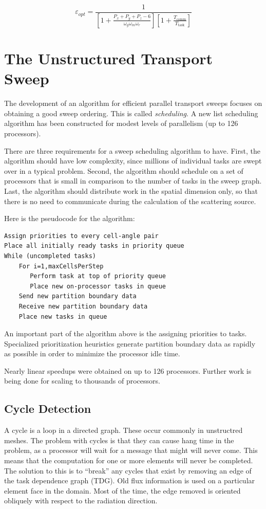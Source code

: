 \documentclass[11pt, letterpaper,titlepage,oneside]{article}
\begin{document}
\begin{equation}
\varepsilon_{opt} = \frac{1}{[1+\frac{P_x+P_y+P_z-6}{\omega_g \omega_m \omega_r}][1+\frac{T_{\text{comm}}}{T_{\text{task}}}]}
\label{overloadpartitioning}
\end{equation}
\section*{The Unstructured Transport Sweep}

The development of an algorithm for efficient parallel transport sweeps focuses on obtaining a good sweep ordering. This is called \textit{scheduling}. A new list scheduling algorithm has been constructed for modest levels of parallelism (up to 126 processors).

There are three requirements for a sweep scheduling algorithm to have. First, the algorithm should have low complexity, since millions of individual tasks are swept over in a typical problem. Second, the algorithm should schedule on a set of processors that is small in comparison to the number of tasks in the sweep graph. Last, the algorithm should distribute work in the spatial dimension only, so that there is no need to communicate during the calculation of the scattering source. 

Here is the pseudocode for the algorithm:

\begin{verbatim}
Assign priorities to every cell-angle pair
Place all initially ready tasks in priority queue
While (uncompleted tasks)
    For i=1,maxCellsPerStep
       Perform task at top of priority queue
       Place new on-processor tasks in queue
    Send new partition boundary data
    Receive new partition boundary data
    Place new tasks in queue 
\end{verbatim}

An important part of the algorithm above is the assigning priorities to tasks. Specialized prioritization heuristics generate partition boundary data as rapidly as possible in order to minimize the processor idle time. 

Nearly linear speedups were obtained on up to 126 processors. Further work is being done for scaling to thousands of processors. 

\subsection*{Cycle Detection}

A cycle is a loop in a directed graph. These occur commonly in unstructred meshes. The problem with cycles is that they can cause hang time in the problem, as a processor will wait for a message that might will never come. This means that the computation for one or more elements will never be completed. The solution to this is to ``break'' any cycles that exist by removing an edge of the task dependence graph (TDG). Old flux information is used on a particular element face in the domain. Most of the time, the edge removed is oriented obliquely with respect to the radiation direction. 
\end{document}
